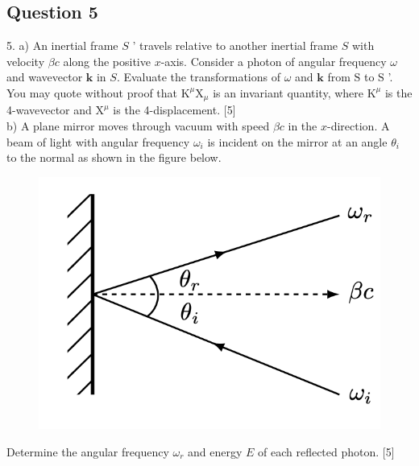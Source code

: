 \documentclass{article}
\begin{document}
\subsection{Question 5}
5. a) An inertial frame $S$ ' travels relative to another inertial frame $S$ with velocity $\beta c$ along the positive $x$-axis. Consider a photon of angular frequency $\omega$ and wavevector $\mathbf{k}$ in $S$. Evaluate the transformations of $\omega$ and $\mathbf{k}$ from $\mathrm{S}$ to $\mathrm{S}$ '. You may quote without proof that $\mathrm{K}^{\mu} \mathrm{X}_{\mu}$ is an invariant quantity, where $\mathrm{K}^{\mu}$ is the 4-wavevector and $\mathrm{X}^{\mu}$ is the 4-displacement. [5] \\
b) A plane mirror moves through vacuum with speed $\beta c$ in the $x$-direction. A beam of light with angular frequency $\omega_{i}$ is incident on the mirror at an angle $\theta_{i}$ to the normal as shown in the figure below. 
\begin{figure}
	\centering
	\includegraphics[width=0.5\linewidth]{spho_book_TYS_images/2017q5.png}
	\caption{}
\end{figure}
Determine the angular frequency $\omega_{r}$ and energy $E$ of each reflected photon. [5]
\end{document}
